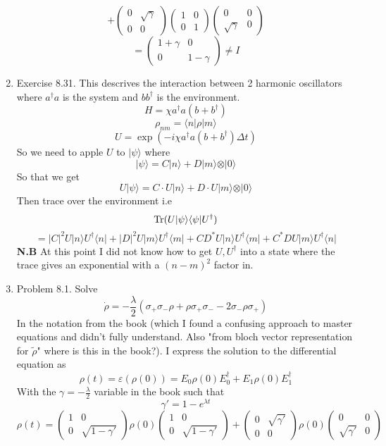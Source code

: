 \documentclass[12pt]{article}
\newcommand{\Tr}{{\rm Tr}}
\newcommand{\ket}[1]{\vert{#1}\rangle}
\newcommand{\bra}[1]{\langle{#1}\vert}
\begin{document}
\begin{enumerate}
    $$ + \left(\begin{array}{cc} 0  & \sqrt{\gamma} \\  0& 0 \end{array}\right) \left(\begin{array}{cc} 1  & 0 \\  0& 1 \end{array}\right) \left(\begin{array}{cc} 0  & 0 \\  \sqrt{\gamma}& 0 \end{array}\right) $$
    $$ = \left(\begin{array}{cc} 1+\gamma  & 0 \\  0& 1-\gamma \end{array}\right) \neq I $$

    \item Exercise 8.31. This descrives the interaction between 2 harmonic oscillators where $a^{\dagger} a$ is the system and $bb^{\dagger}$ is the environment. 
    $$ H = \chi a^{\dagger} a(b+b^{\dagger} ) $$
    $$ \rho_{nm} = \langle n | \rho | m \rangle $$
    $$ U = \exp (-i \chi a^{\dagger} a(b+b^{\dagger} ) \Delta t)$$
    So we need to apple $U$ to $\ket{\psi} $ where 
    $$ \ket{\psi} = C \ket{n} + D \ket{m} \otimes \ket{0} $$
    So that we get 
    $$ U \ket{\psi} = C \cdot U \ket{n} + D \cdot U \ket{m} \otimes \ket{0} $$
    Then trace over the environment i.e
     $$ \Tr(U \ket{\psi} \bra{\psi} U^{\dagger} ) $$
    $$ = |C|^2 U \ket{n} U^{\dagger} \bra{n} + |D|^2 U \ket{m} U^{\dagger} \bra{m} + CD^* U \ket{n} U^{\dagger} \bra{m} + C^* D U \ket{m} U^{\dagger} \bra{n} $$
    \textbf{N.B} At this point I did not know how to get $U, U^{\dagger}$ into a state where the trace gives an exponential with a $(n-m)^2$ factor in. 
    \item Problem 8.1. Solve 
    $$ \dot{\rho} = - \frac{\lambda}{2} ( \sigma_+ \sigma_- \rho + \rho \sigma_+ \sigma_- - 2 \sigma_- \rho \sigma_+) $$
    In the notation from the book (which I found a confusing approach to master equations and didn't fully understand. Also "from bloch vector representation for $\tilde{\rho}$" where is this in the book?). I express the solution to the differential equation as 
    $$ \rho (t) = \varepsilon (\rho (0)) = E_0 \rho(0) E_0^{\dagger} + E_1 \rho (0) E_1^{\dagger} $$
    With the $\gamma = -\frac{\lambda}{2}$ variable in the book such that 
    $$ \gamma' = 1- e^{\lambda t} $$
    $$ \rho (t) = \left(\begin{array}{cc} 1  & 0 \\  0& \sqrt{1-\gamma'} \end{array}\right) \rho (0) \left(\begin{array}{cc} 1  & 0 \\  0& \sqrt{1-\gamma'} \end{array}\right) + \left(\begin{array}{cc} 0  & \sqrt{\gamma'} \\  0& 0 \end{array}\right) \rho (0) \left(\begin{array}{cc} 0  &  0\\  \sqrt{\gamma'}& 0 \end{array}\right) $$

\end{enumerate}
\end{document}
